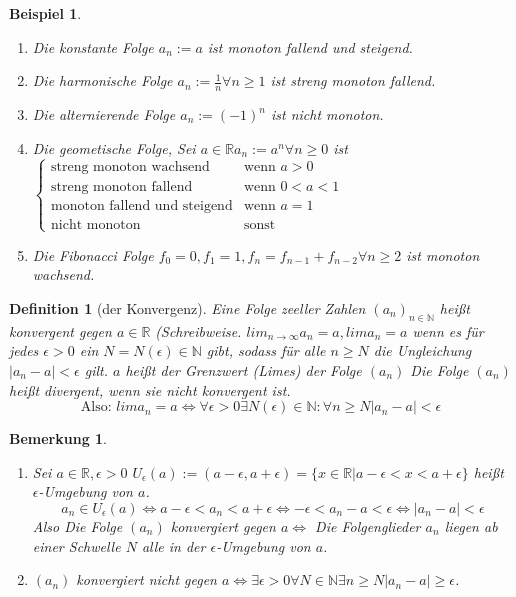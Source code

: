 \documentclass[a4paper,titlepage,oneside]{article}
\def\N{\ensuremath{\mathbb{N}} }
\def\R{\ensuremath{\mathbb{R}} }
\newcommand{\fa}[1]{\ensuremath{\forall#1}}
\newcommand{\exin}[2]{\ensuremath{\exists#1\in#2}}
\newcommand{\abs}[1]{\ensuremath{\left|#1\right|}}
\theoremstyle{thmstyle}
\newtheorem{defi}[satz]{Definition}
\newtheorem{bsp}[satz]{Beispiel}
\newtheorem{bem}[satz]{Bemerkung}
\begin{document}
\begin{bsp}
\begin{enumerate}
\item Die konstante Folge $a_n := a$ ist monoton fallend und steigend.
\item Die harmonische Folge $a_n := \frac{1}{n} \fa{n\ge1}$ ist streng monoton fallend.
\item Die alternierende Folge $a_n := (-1)^n$ ist nicht monoton.
\item Die geometische Folge, Sei $a\in\R a_n := a^n \fa{n\ge0}$ ist \(\begin{cases}
\text{streng monoton wachsend} & \text{wenn } a > 0\\
\text{streng monoton fallend} & \text{wenn } 0 < a < 1\\
\text{monoton fallend und steigend} & \text{wenn } a = 1\\
\text{nicht monoton} & \text{sonst}
\end{cases} \)
\item Die Fibonacci Folge \(f_0 = 0, f_1 = 1, f_n = f_{n-1} + f_{n-2} \fa{n \ge 2}\) ist monoton wachsend.
\end{enumerate}
\end{bsp}

\begin{defi}[der Konvergenz]
Eine Folge zeeller Zahlen $(a_n)_{n\in\N}$ heißt konvergent gegen $ a\in\R$ (Schreibweise. ${lim}_{n\rightarrow\infty}a_n = a, lim a_n = a$
wenn es für jedes $\epsilon > 0$ ein $N = N(\epsilon) \in \N$ gibt, sodass für alle $n \ge N$ die Ungleichung $\abs{a_n - a} < \epsilon$ gilt.
$a$ heißt der Grenzwert (Limes) der Folge $(a_n)$
Die Folge $(a_n)$ heißt divergent, wenn sie nicht konvergent ist.
\[\text{Also: }lim a_n = a \Leftrightarrow \fa{\epsilon > 0} \exin{N(\epsilon)}{\N} : \fa{n\ge N} \abs{a_n - a} < \epsilon\]
\end{defi}

\begin{bem}
\begin{enumerate}
\item Sei $a \in \R, \epsilon > 0$ $U_\epsilon(a) := (a-\epsilon, a+\epsilon) = \{x \in \R | a - \epsilon < x < a + \epsilon\}$ heißt $\epsilon$-Umgebung von $a$. \[ a_n \in U_\epsilon(a) \Leftrightarrow a-\epsilon < a_n < a + \epsilon \Leftrightarrow -\epsilon < a_n - a < \epsilon \Leftrightarrow \abs{a_n - a} < \epsilon\]
Also Die Folge $(a_n)$ konvergiert gegen $a \Leftrightarrow $ Die Folgenglieder $a_n$ liegen ab einer Schwelle $N$ alle in der $\epsilon$-Umgebung von $a$.
\item $(a_n)$ konvergiert nicht gegen $a \Leftrightarrow \exists \epsilon > 0 \forall N\in\N \exists n \ge N |a_n - a| \ge \epsilon$.
\end{enumerate}
\end{bem}
\end{document}
